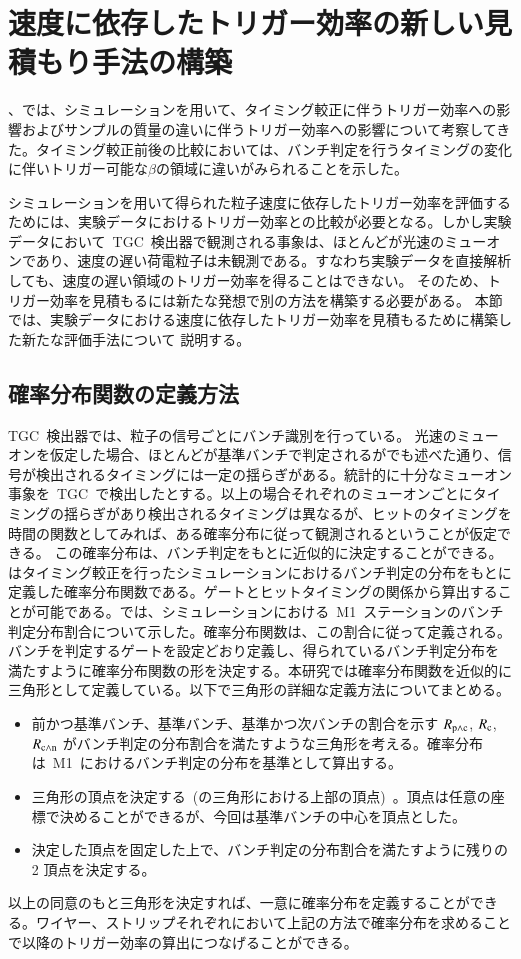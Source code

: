 \section{速度に依存したトリガー効率の新しい見積もり手法の構築}\label{sec:est}
、では、シミュレーションを用いて、タイミング較正に伴うトリガー効率への影響およびサンプルの質量の違いに伴うトリガー効率への影響について考察してきた。タイミング較正前後の比較においては、バンチ判定を行うタイミングの変化に伴いトリガー可能な$\beta$の領域に違いがみられることを示した。

シミュレーションを用いて得られた粒子速度に依存したトリガー効率を評価するためには、実験データにおけるトリガー効率との比較が必要となる。しかし実験データにおいて~TGC~検出器で観測される事象は、ほとんどが光速のミューオンであり、速度の遅い荷電粒子は未観測である。すなわち実験データを直接解析しても、速度の遅い領域のトリガー効率を得ることはできない。
そのため、トリガー効率を見積もるには新たな発想で別の方法を構築する必要がある。
本節では、実験データにおける速度に依存したトリガー効率を見積もるために構築した新たな評価手法について
説明する。
\subsection{確率分布関数の定義方法}\label{sec:pro}
TGC~検出器では、粒子の信号ごとにバンチ識別を行っている。
光速のミューオンを仮定した場合、ほとんどが基準バンチで判定されるがでも述べた通り、信号が検出されるタイミングには一定の揺らぎがある。統計的に十分なミューオン事象を~TGC~で検出したとする。以上の場合それぞれのミューオンごとにタイミングの揺らぎがあり検出されるタイミングは異なるが、ヒットのタイミングを時間の関数としてみれば、ある確率分布に従って観測されるということが仮定できる。
この確率分布は、バンチ判定をもとに近似的に決定することができる。はタイミング較正を行ったシミュレーションにおけるバンチ判定の分布をもとに定義した確率分布関数である。ゲートとヒットタイミングの関係から算出することが可能である。では、シミュレーションにおける~M1~ステーションのバンチ判定分布割合について示した。確率分布関数は、この割合に従って定義される。バンチを判定するゲートを設定どおり定義し、得られているバンチ判定分布を満たすように確率分布関数の形を決定する。本研究では確率分布関数を近似的に三角形として定義している。以下で三角形の詳細な定義方法についてまとめる。
\begin{itemize}
\item 前かつ基準バンチ、基準バンチ、基準かつ次バンチの割合を示す $\it{R}_{\rm{p{\land}c}}$, $\it{R}_{\rm{c}}$, $\it{R}_{\rm{c{\land}n}}$ がバンチ判定の分布割合を満たすような三角形を考える。確率分布は~M1~におけるバンチ判定の分布を基準として算出する。
\item 三角形の頂点を決定する~(の三角形における上部の頂点)~。頂点は任意の座標で決めることができるが、今回は基準バンチの中心を頂点とした。
\item 決定した頂点を固定した上で、バンチ判定の分布割合を満たすように残りの 2 頂点を決定する。
\end{itemize}
以上の同意のもと三角形を決定すれば、一意に確率分布を定義することができる。ワイヤー、ストリップそれぞれにおいて上記の方法で確率分布を求めることで以降のトリガー効率の算出につなげることができる。

